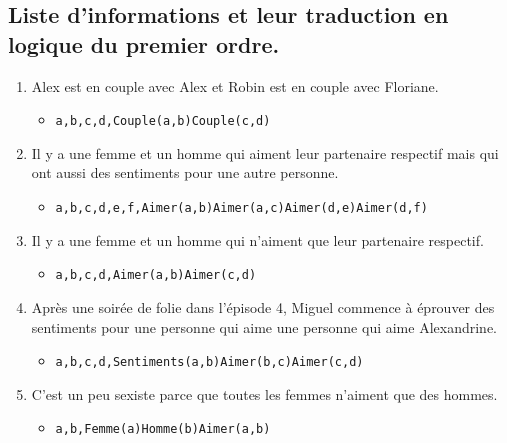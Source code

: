 \documentclass[Arial, 11pt]{article}
\begin{document}
\subsection*{Liste d'informations et leur traduction en logique du premier ordre.}
\begin{enumerate}
    \item Alex est en couple avec Alex et Robin est en couple avec Floriane.
    \begin{itemize}
        \item \begin{alltt}\exists a,b,c,d, Couple(a,b) \bigwedge Couple(c,d)
        \end{alltt}
    \end{itemize}
    \item Il y a une femme et un homme qui aiment leur partenaire respectif mais qui ont aussi des sentiments pour une autre personne.
    \begin{itemize}
        \item \begin{alltt}\exists a,b,c,d,e,f, Aimer(a,b) \bigwedge Aimer(a,c) \bigwedge Aimer(d,e) \bigwedge Aimer(d,f)
        \end{alltt}
    \end{itemize}
    \item Il y a une femme et un homme qui n’aiment que leur partenaire respectif.
    \begin{itemize}
        \item \begin{alltt}\exists a,b,c,d, Aimer(a,b) \bigwedge Aimer(c,d)
        \end{alltt}
    \end{itemize}
    \item Après une soirée de folie dans l’épisode 4, Miguel commence à éprouver des sentiments pour une personne qui aime une personne qui aime Alexandrine.
    \begin{itemize}
        \item \begin{alltt}\exists a,b,c,d, Sentiments(a,b) \bigwedge Aimer(b,c) \bigwedge Aimer(c,d)
        \end{alltt}
    \end{itemize}
    \item C’est un peu sexiste parce que toutes les femmes n’aiment que des hommes.
    \begin{itemize}
        \item \begin{alltt}\forall a,b, Femme(a) \bigwedge Homme(b) \to Aimer(a,b)

\end{alltt}
\end{itemize}
\end{enumerate}
\end{document}
